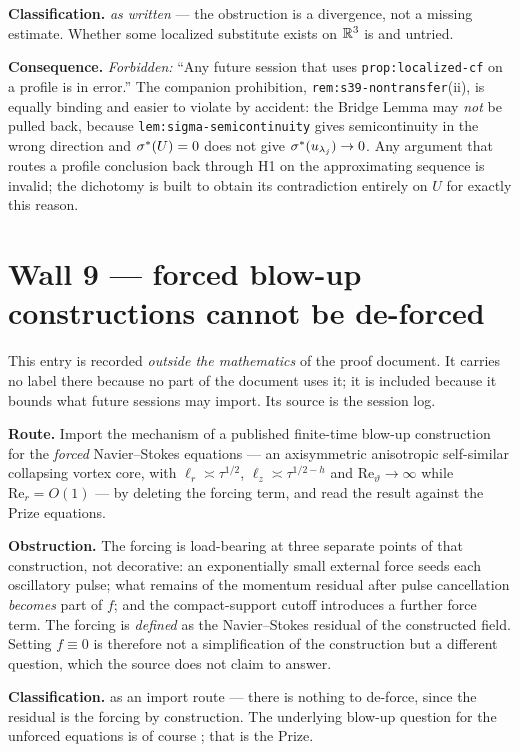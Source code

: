 \textbf{Classification.} \IMPOSSIBLE{} \emph{as written} --- the obstruction is
a divergence, not a missing estimate. Whether some localized substitute exists
on \(\mathbb{R}^3\) is \OPEN{} and untried.

\textbf{Consequence.} \emph{Forbidden:} ``Any future session that uses
\texttt{prop:localized-cf} on a profile is in error.'' The companion
prohibition, \texttt{rem:s39-nontransfer}(ii), is equally binding and easier to
violate by accident: the Bridge Lemma may \emph{not} be pulled back, because
\texttt{lem:sigma-semicontinuity} gives semicontinuity in the wrong direction
and \(\sigma^{*}(U)=0\) does not give \(\sigma^{*}(u_{\lambda_j})\to0\). Any argument
that routes a profile conclusion back through H1 on the approximating sequence
is invalid; the  dichotomy is built to obtain its contradiction entirely
on \(U\) for exactly this reason.

\section{Wall 9 --- forced blow-up constructions cannot be de-forced}
\label{sec:wall9}

This entry is recorded \emph{outside the mathematics} of the proof document.
It carries no label there because no part of the document uses it; it is
included because it bounds what future sessions may import. Its source is the
 session log.

\textbf{Route.} Import the mechanism of a published finite-time blow-up
construction for the \emph{forced} Navier--Stokes equations --- an axisymmetric
anisotropic self-similar collapsing vortex core, with
\(\ell_r\asymp\tau^{1/2}\), \(\ell_z\asymp\tau^{1/2-h}\) and
\(\mathrm{Re}_\vartheta\to\infty\) while \(\mathrm{Re}_r=O(1)\) --- by deleting
the forcing term, and read the result against the Prize equations.

\textbf{Obstruction.} The forcing is load-bearing at three separate points of
that construction, not decorative: an exponentially small external force seeds
each oscillatory pulse; what remains of the momentum residual after pulse
cancellation \emph{becomes} part of \(f\); and the compact-support cutoff
introduces a further force term. The forcing is \emph{defined} as the
Navier--Stokes residual of the constructed field. Setting \(f\equiv0\) is
therefore not a simplification of the construction but a different question,
which the source does not claim to answer.

\textbf{Classification.} \IMPOSSIBLE{} as an import route --- there is nothing
to de-force, since the residual is the forcing by construction. The underlying
blow-up question for the unforced equations is of course \OPEN{}; that is the
Prize.

